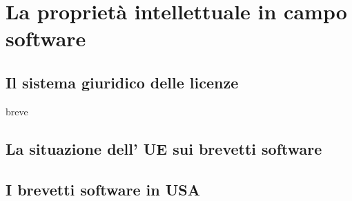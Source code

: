 \chapter{La proprietà intellettuale in campo software}


\section{Il sistema giuridico delle licenze}
breve
\section{La situazione dell' UE sui brevetti software}
\section{I brevetti software in USA}
